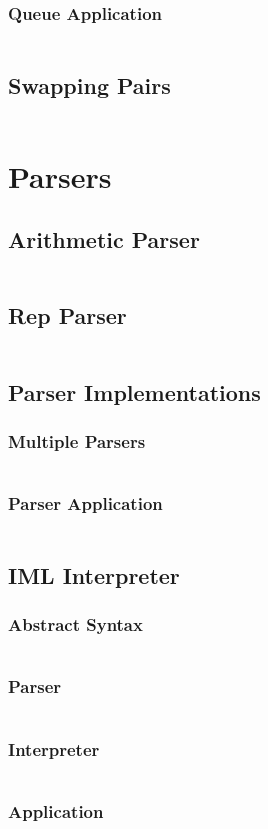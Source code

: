 \documentclass[a4paper,9pt,twoside]{book}
\newcommand{\scalafile}[1]{\inputminted[breaklines]{scala}{../scala/#1.scala}}
\begin{document}
\subsection{Queue Application}
\scalafile{generics/QueueTest}
\section{Swapping Pairs}
\scalafile{generics/Pair}

\chapter{Parsers}
\section{Arithmetic Parser}
\scalafile{parser/ArithmeticParser}
\section{Rep Parser}
\scalafile{parser/RepParser}
\section{Parser Implementations}
\subsection{Multiple Parsers}
\scalafile{parser/Parser}
\subsection{Parser Application}
\scalafile{parser/ParserTest}
\section{IML Interpreter}
\subsection{Abstract Syntax}
\scalafile{parser/Syntax}
\subsection{Parser}
\scalafile{parser/IMLParser}
\subsection{Interpreter}
\scalafile{parser/Interpreter}
\subsection{Application}
\scalafile{parser/Test}
\end{document}
